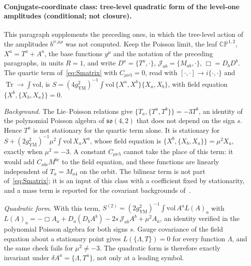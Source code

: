\paragraph{Conjugate-coordinate class: tree-level quadratic form of the level-one amplitudes (conditional; not closure).}
This paragraph supplements the preceding ones, in which the tree-level action of the amplitudes \(b^{\nu;\mu\rho}\) was not computed. Keep the Poisson limit, the leaf \(\mathbb{CP}^{1,2}\), \(X^a=T^a+A^a\), the base functions \(y^\mu\) and the notation of the preceding paragraphs, in units \(R=1\), and write \(D^a=\{T^a,\cdot\}\), \(\mathcal J_{ab}=\{M_{ab},\cdot\}\), \(\Box=D_bD^b\). The quartic term of~\eqref{eq:Smatrix} with \(C_{\mu\nu\lambda}=0\), read with \([\cdot,\cdot]\to i\{\cdot,\cdot\}\) and \(\operatorname{Tr}\to\int\mathrm{vol}\), is \(S=(4g_{\mathrm{YM}}^2)^{-1}\int\mathrm{vol}\,\{X^a,X^b\}\{X_a,X_b\}\), with field equation \(\{X^b,\{X_b,X_a\}\}=0\).

\emph{Background.} The Lie--Poisson relations give \(\{T_a,\{T^a,T^b\}\}=-3T^b\), an identity of the polynomial Poisson algebra of \(\mathfrak{so}(4,2)\) that does not depend on the sign \(s\). Hence \(T^a\) is not stationary for the quartic term alone. It is stationary for \(S+(2g_{\mathrm{YM}}^2)^{-1}\mu^2\int\mathrm{vol}\,X_aX^a\), whose field equation is \(\{X^b,\{X_b,X_a\}\}=\mu^2X_a\), exactly when \(\mu^2=-3\). A constant \(C_{\mu\nu\lambda}\) cannot take the place of this term: it would add \(C_{abc}M^{bc}\) to the field equation, and these functions are linearly independent of \(T_a=M_{a4}\) on the orbit. The bilinear term is not part of~\eqref{eq:Smatrix}; it is an input of this class with a coefficient fixed by stationarity, and a mass term is reported for the covariant backgrounds of~\cite{SperlingSteinacker2019}.

\emph{Quadratic form.} With this term, \(S^{(2)}=(2g_{\mathrm{YM}}^2)^{-1}\int\mathrm{vol}\,A^aL(A)_a\) with \(L(A)_a=-\Box A_a+D_a(D_bA^b)-2s\,\mathcal J_{ab}A^b+\mu^2A_a\), an identity verified in the polynomial Poisson algebra for both signs \(s\). Gauge covariance of the field equation about a stationary point gives \(L(\{\Lambda,T\})=0\) for every function \(\Lambda\), and the same check fails for \(\mu^2\neq-3\). The quadratic form is therefore exactly invariant under \(\delta A^a=\{\Lambda,T^a\}\), not only at a leading symbol.

